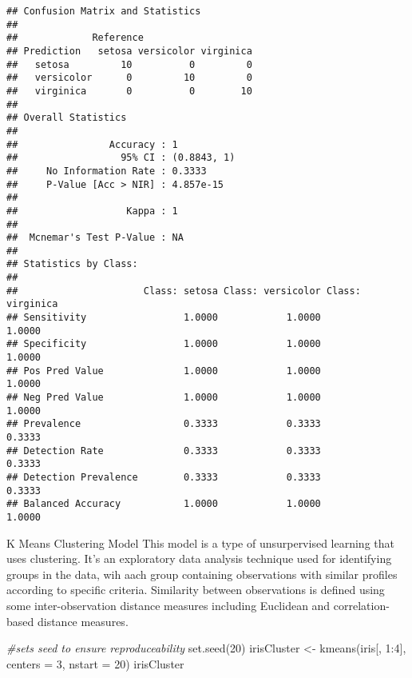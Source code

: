 \documentclass[
]{article}
\newenvironment{Shaded}{\begin{snugshade}}{\end{snugshade}}
\newcommand{\AttributeTok}[1]{\textcolor[rgb]{0.77,0.63,0.00}{#1}}
\newcommand{\CommentTok}[1]{\textcolor[rgb]{0.56,0.35,0.01}{\textit{#1}}}
\newcommand{\DecValTok}[1]{\textcolor[rgb]{0.00,0.00,0.81}{#1}}
\newcommand{\FunctionTok}[1]{\textcolor[rgb]{0.00,0.00,0.00}{#1}}
\newcommand{\NormalTok}[1]{#1}
\newcommand{\OtherTok}[1]{\textcolor[rgb]{0.56,0.35,0.01}{#1}}
\newcommand{\SpecialCharTok}[1]{\textcolor[rgb]{0.00,0.00,0.00}{#1}}
\begin{document}
\begin{verbatim}
## Confusion Matrix and Statistics
## 
##             Reference
## Prediction   setosa versicolor virginica
##   setosa         10          0         0
##   versicolor      0         10         0
##   virginica       0          0        10
## 
## Overall Statistics
##                                      
##                Accuracy : 1          
##                  95% CI : (0.8843, 1)
##     No Information Rate : 0.3333     
##     P-Value [Acc > NIR] : 4.857e-15  
##                                      
##                   Kappa : 1          
##                                      
##  Mcnemar's Test P-Value : NA         
## 
## Statistics by Class:
## 
##                      Class: setosa Class: versicolor Class: virginica
## Sensitivity                 1.0000            1.0000           1.0000
## Specificity                 1.0000            1.0000           1.0000
## Pos Pred Value              1.0000            1.0000           1.0000
## Neg Pred Value              1.0000            1.0000           1.0000
## Prevalence                  0.3333            0.3333           0.3333
## Detection Rate              0.3333            0.3333           0.3333
## Detection Prevalence        0.3333            0.3333           0.3333
## Balanced Accuracy           1.0000            1.0000           1.0000
\end{verbatim}

K Means Clustering Model This model is a type of unsurpervised learning
that uses clustering. It's an exploratory data analysis technique used
for identifying groups in the data, wih aach group containing
observations with similar profiles according to specific criteria.
Similarity between observations is defined using some inter-observation
distance measures including Euclidean and correlation-based distance
measures.

\begin{Shaded}
\begin{Highlighting}[]
\CommentTok{\#sets seed to ensure reproduceability}
\FunctionTok{set.seed}\NormalTok{(}\DecValTok{20}\NormalTok{)}
\NormalTok{irisCluster }\OtherTok{\textless{}{-}} \FunctionTok{kmeans}\NormalTok{(iris[, }\DecValTok{1}\SpecialCharTok{:}\DecValTok{4}\NormalTok{], }\AttributeTok{centers =} \DecValTok{3}\NormalTok{, }\AttributeTok{nstart =} \DecValTok{20}\NormalTok{)}
\NormalTok{irisCluster}
\end{Highlighting}
\end{Shaded}
\end{document}
